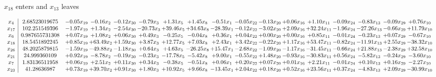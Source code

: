 \documentclass[9pt]{article}
\begin{document}
 $ x_{18} $ enters and $ x_{13} $ leaves 

 \[\begin{array}{c| c c@{\hskip 2pt} c@{\hskip 2pt} c@{\hskip 2pt} c@{\hskip 2pt} c@{\hskip 2pt} c@{\hskip 2pt} c@{\hskip 2pt} c@{\hskip 2pt} c@{\hskip 2pt} c@{\hskip 2pt} c@{\hskip 2pt} c@{\hskip 2pt} c@{\hskip 2pt} c@{\hskip 2pt} c@{\hskip 2pt} }
 x_{4}   &  2.68523019675 & -0.05 x_{19} & -0.16 x_{2} & -0.12 x_{30} & -0.79 x_{3} & +  1.31 x_{5} & +  1.45 x_{8} & -0.51 x_{1} & -0.05 x_{22} & -0.13 x_{20} & +  0.06 x_{16} & +  1.10 x_{11} & -0.09 x_{24} & -0.83 x_{13} & -0.09 x_{29} & +  0.76 x_{10}\\
 x_{17}   &  102.251549396 & -1.97 x_{19} & +  1.34 x_{2} & -2.54 x_{30} & -20.73 x_{3} & + 39.46 x_{5} & + 34.63 x_{8} & -28.39 x_{1} & -0.12 x_{22} & -3.02 x_{20} & +  2.09 x_{16} & + 32.24 x_{11} & -1.96 x_{24} & -27.26 x_{13} & -0.66 x_{29} & + 11.79 x_{10}\\
 x_{6}   &  0.987655731308 & +  0.07 x_{19} & +  1.08 x_{2} & +  0.06 x_{30} & +  0.49 x_{3} & -0.25 x_{5} & -0.04 x_{8} & +  0.36 x_{1} & +  0.04 x_{22} & +  0.00 x_{20} & +  0.00 x_{16} & +  0.85 x_{11} & -0.01 x_{24} & -0.23 x_{13} & +  0.07 x_{29} & -0.67 x_{10}\\
 x_{18}   &  18.5451892245 & +  0.85 x_{19} & + 63.49 x_{2} & +  1.59 x_{30} & +  3.87 x_{3} & + 12.77 x_{5} & +  7.03 x_{8} & +  2.43 x_{1} & +  3.42 x_{22} & -0.22 x_{20} & +  1.17 x_{16} & + 53.47 x_{11} & -0.82 x_{24} & -11.91 x_{13} & +  2.55 x_{29} & -38.32 x_{10}\\
 x_{26}   &  48.2025879815 & -1.59 x_{19} & -49.88 x_{2} & -1.18 x_{30} & +  0.64 x_{3} & +  4.63 x_{5} & -26.25 x_{8} & + 15.47 x_{1} & -2.68 x_{22} & -1.09 x_{20} & -1.17 x_{16} & -31.45 x_{11} & -0.66 x_{24} & + 21.88 x_{13} & -2.38 x_{29} & + 32.58 x_{10}\\
 x_{21}   &  24.999360109 & +  0.92 x_{19} & -8.78 x_{2} & -0.19 x_{30} & -0.23 x_{3} & -17.78 x_{5} & -5.42 x_{8} & +  9.00 x_{1} & -0.55 x_{22} & +  1.48 x_{20} & -0.93 x_{16} & -30.83 x_{11} & +  0.56 x_{24} & -5.82 x_{13} & -0.24 x_{29} & -3.60 x_{10}\\
 x_{7}   &  1.83136511958 & +  0.06 x_{19} & +  2.51 x_{2} & +  0.11 x_{30} & +  0.34 x_{3} & -0.38 x_{5} & -0.51 x_{8} & +  0.06 x_{1} & +  0.20 x_{22} & +  0.07 x_{20} & +  0.01 x_{16} & +  2.21 x_{11} & -0.01 x_{24} & +  0.10 x_{13} & +  0.16 x_{29} & -2.27 x_{10}\\
 x_{23}   &  41.28636987 & +  0.73 x_{19} & + 39.70 x_{2} & +  0.91 x_{30} & +  1.80 x_{3} & + 10.92 x_{5} & +  9.66 x_{8} & -13.45 x_{1} & +  2.04 x_{22} & +  0.18 x_{20} & +  0.52 x_{16} & + 23.56 x_{11} & +  0.37 x_{24} & -4.83 x_{13} & +  2.09 x_{29} & -30.99 x_{10}\\

\end{array}\]
\end{document}
